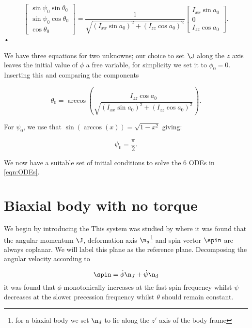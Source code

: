 \documentclass[/home/greg/Thesis/main/main.tex]{subfiles}
\begin{document}
\begin{equation}
\left[ \begin{array}{c}
\sin \psi_{0} \sin \theta_{0} \\
\sin \psi_{0} \cos \theta_{0} \\
\cos \theta_{0}
\end{array}\right]
 = \frac{1}{\sqrt{(I_{xx}\sin a_{0})^{2}  + (I_{zz}\cos a_{0})^{2}}} 
\left[ \begin{array}{c}
I_{xx}\sin a_{0} \\
0 \\
I_{zz} \cos a_{0}
\end{array}\right].
\end{equation}•

We have three equations for two unknowns; our choice to set $\J$ along
the $z$ axis leaves the initial value of $\phi$ a free variable, for simplicity
we set it to $\phi_{0} = 0$. Inserting this and comparing the components

\begin{equation}
\theta_{0} =  \arccos\left(\frac{I_{zz}\cos a_{0}}{ \sqrt{(I_{xx}\sin a_{0})^{2}  + (I_{zz}\cos a_{0})^{2}}} \right).
\label{eqn:theta init}
\end{equation} 

For $\psi_0$, we  use that $\sin(\arccos(x)) = \sqrt{1 - x^{2}}$ giving:

\begin{equation}
\psi_0 = \frac{\pi}{2}.
\end{equation}

We now have a suitable set of initial conditions to solve the 6 ODEs in \eqref{eqn:ODEs}.

\section{Biaxial body with no torque}
We begin by introducing the 
This system was studied by \citet{Jones2001} where it was  found that the
angular momentum $\J$, deformation axis $\n_{d}$\footnote{for a biaxial body we
    set $\n_{d}$ to lie along the $z'$ axis of the body frame} and spin vector
    $\spin$ are always coplanar. We will label this plane as the reference
    plane. Decomposing the angular velocity according to 

\begin{equation}
\spin = \dot{\phi}\n_{J} + \dot{\psi}\n_{d}
\label{eqn:decomp}
\end{equation}
it was found that $\phi$ monotonically increases at the  fast spin frequency whilst $\psi$ decreases at the slower precession frequency whilst $\theta$ should remain constant. 
\end{document}
